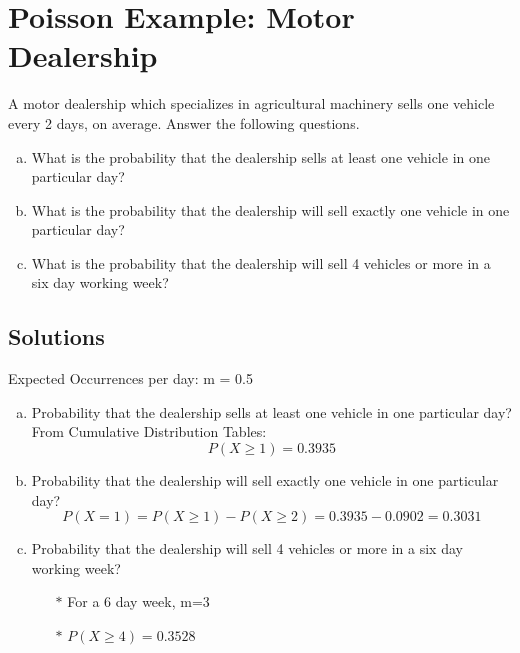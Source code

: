 \documentclass[a4paper,12pt]{article}
\begin{document}
\section*{Poisson Example: Motor Dealership}
A motor dealership which specializes in agricultural machinery sells one vehicle every 2 days, on average. Answer the following questions.
\begin{enumerate}[(a)]
	\item  What is the probability that the dealership sells at least one vehicle in one particular day?
	\item  What is the probability that the dealership will sell exactly one vehicle in one particular day?
	\item  What is the probability that the dealership will sell 4 vehicles or more in a six day working week?
\end{enumerate}

\subsection*{Solutions}

Expected Occurrences per day: m = 0.5

\begin{enumerate}[(a)]
	\item Probability that the dealership sells at least one vehicle in one particular day?\\
	
	\smallskip
	From Cumulative Distribution Tables:
	\[ P(X \geq 1) = 0.3935 \]
	\item Probability that the dealership will sell exactly one vehicle in one particular day?
	\[ P(X = 1) = P(X \geq 1) - P(X \geq 2)  = 0.3935 - 0.0902 = 0.3031\]
	\item Probability that the dealership will sell 4 vehicles or more in a six day working week?
	\begin{itemize}
		\item[$\ast$] For a 6 day week, m=3
		\item[$\ast$] $P(X \geq 4) = 0.3528$
	\end{itemize}
\end{enumerate}
\end{document}
